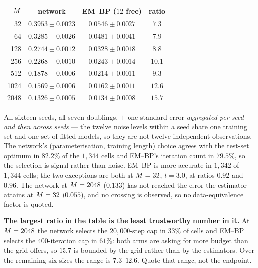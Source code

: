 \begin{center}\small
\begin{tabular}{@{}rccc@{}}
\toprule
$M$ & network & EM--BP ($12$ free) & ratio \\
\midrule
32   & $0.3953 \pm 0.0023$ & $\mathbf{0.0546 \pm 0.0027}$ & $7.3$ \\
64   & $0.3285 \pm 0.0026$ & $\mathbf{0.0481 \pm 0.0041}$ & $7.9$ \\
128  & $0.2744 \pm 0.0012$ & $\mathbf{0.0328 \pm 0.0018}$ & $8.8$ \\
256  & $0.2268 \pm 0.0010$ & $\mathbf{0.0243 \pm 0.0014}$ & $10.1$ \\
512  & $0.1878 \pm 0.0006$ & $\mathbf{0.0214 \pm 0.0011}$ & $9.3$ \\
1024 & $0.1569 \pm 0.0006$ & $\mathbf{0.0162 \pm 0.0011}$ & $12.6$ \\
2048 & $0.1326 \pm 0.0005$ & $\mathbf{0.0134 \pm 0.0008}$ & $15.7$ \\
\bottomrule
\end{tabular}
\end{center}

All sixteen seeds, all seven doublings, $\pm$ one standard error \emph{aggregated per seed and then
across seeds} --- the twelve noise levels within a seed share one training set and one set of
fitted models, so they are not twelve independent observations. The network's
(parameterisation, training length) choice agrees with the test-set optimum in $82.2\%$ of the
$1{,}344$ cells and EM--BP's iteration count in $79.5\%$, so the selection is signal rather than
noise. EM--BP is more accurate in $1{,}342$ of $1{,}344$ cells; the two exceptions are both at
$M=32$, $t=3.0$, at ratios $0.92$ and $0.96$. The network at $M=2048$ ($0.133$) has not
reached the error the estimator attains at $M=32$ ($0.055$), and no crossing is observed, so no
data-equivalence factor is quoted.

\begin{pitfall}
\textbf{The largest ratio in the table is the least trustworthy number in it.} At $M=2048$ the
network selects the $20{,}000$-step cap in $33\%$ of cells and EM--BP selects the $400$-iteration
cap in $61\%$: both arms are asking for more budget than the grid offers, so $15.7$ is bounded by
the grid rather than by the estimators. Over the remaining six sizes the range is $7.3$--$12.6$.
Quote that range, not the endpoint.
\end{pitfall}

